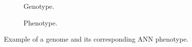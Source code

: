 \begin{figure}[htb]
    \begin{mdframed}
        \begin{subfigure}[b]{0.45\textwidth}
            \centering
            \resizebox{1\textwidth}{!}{}
            \caption{Genotype.}
            \label{genotype}
        \end{subfigure}
        \begin{subfigure}[b]{0.45\textwidth}
            \centering
            \resizebox{0.65\textwidth}{!}{}
            \caption{Phenotype.}
            \label{phenotype}
        \end{subfigure}
    \end{mdframed}
    \caption{Example of a genome and its corresponding ANN phenotype.}
    \label{mapping}
\end{figure}
